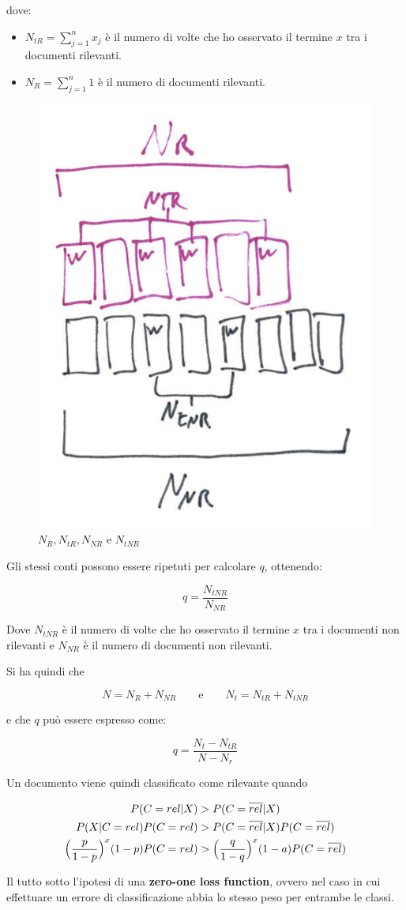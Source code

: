 \noindent dove:
\begin{itemize}
	\item $N_{tR} = \sum\limits_{j = 1}^n x_j$ è il numero di volte che ho osservato il termine $x$ tra i documenti rilevanti.
	\item $N_R = \sum\limits_{j = 1}^n 1$ è il numero di documenti rilevanti.
\end{itemize}

\begin{figure}[htbp]
	\centering
	\includegraphics[width=.35\textwidth]{images/l10-fig-1}
	\caption{$N_R, N_{tR}, N_{NR}$ e $N_{tNR}$}
\end{figure}

Gli stessi conti possono essere ripetuti per calcolare $q$, ottenendo:

$$
\boxed{q = \frac{N_{tNR}}{N_{NR}}}
$$

\noindent Dove $N_{tNR}$ è il numero di volte che ho osservato il termine $x$ tra i documenti non rilevanti e $N_{NR}$ è il numero di documenti non rilevanti.

Si ha quindi che 

$$
N = N_R + N_{NR} \qquad \text{e} \qquad N_t = N_{tR} + N_{tNR}
$$

e che $q$ può essere espresso come:

$$
q = \frac{N_t - N_{tR}}{N - N_r}
$$

Un documento viene quindi classificato come rilevante quando

\begin{align*}
	P(C = rel | X) &> P(C = \overline{rel} | X)\\
	P(X | C=rel)P(C=rel) &> P(C = \overline{rel} |X)P(C = \overline{rel}) \\
	\Big( \frac{p}{1-p} \Big)^x(1-p) P(C = rel) &> \Big(\frac{q}{1-q}\Big)^x (1-a)P(C = \overline{rel})
\end{align*}

Il tutto sotto l'ipotesi di una \textbf{zero-one loss function}, ovvero nel caso in cui effettuare un errore di classificazione abbia lo stesso peso per entrambe le classi.

